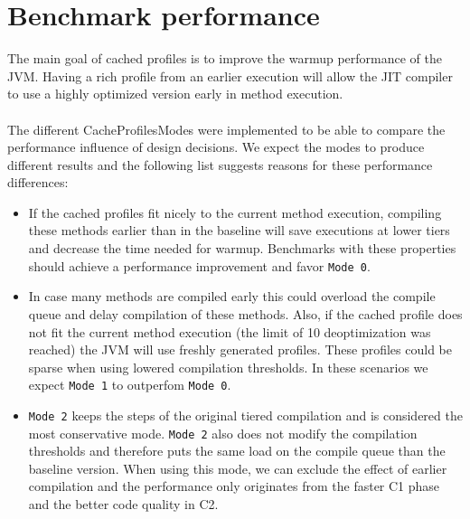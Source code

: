 \section{Benchmark performance}
\label{s:perf_benchmark}
The main goal of cached profiles is to improve the warmup performance of the JVM. Having a rich profile from an earlier execution will allow the JIT compiler to use a highly optimized version early in method execution.
\\\\
The different CacheProfilesModes were implemented to be able to compare the performance influence of design decisions. We expect the modes to produce different results and the following list suggests reasons for these performance differences:
\begin{itemize}
  \item If the cached profiles fit nicely to the current method execution, compiling these methods earlier than in the baseline will save executions at lower tiers and decrease the time needed for warmup. Benchmarks with these properties should achieve a performance improvement and favor \texttt{Mode 0}.
  \item In case many methods are compiled early this could overload the compile queue and delay compilation of these methods. Also, if the cached profile does not fit the current method execution (the limit of 10 deoptimization was reached) the JVM will use freshly generated profiles. These profiles could be sparse when using lowered compilation thresholds. In these scenarios we expect \texttt{Mode 1} to outperfom \texttt{Mode 0}.
  \item \texttt{Mode 2} keeps the steps of the original tiered compilation and is considered the most conservative mode. \texttt{Mode 2} also does not modify the compilation thresholds and therefore puts the same load on the compile queue than the baseline version. When using this mode, we can exclude the effect of earlier compilation and the performance only originates from the faster C1 phase and the better code quality in C2.
\end{itemize}
